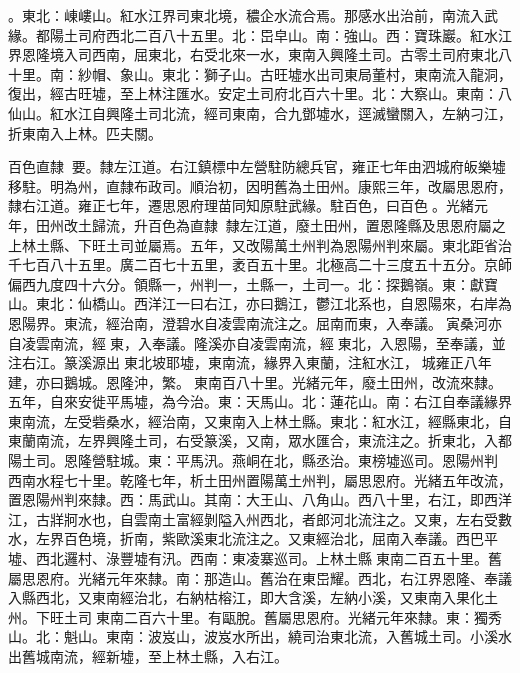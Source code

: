 \begin{pinyinscope}
。東北：崠嶁山。紅水江界司東北境，穠企水流合焉。那感水出治前，南流入武緣。都陽土司府西北二百八十五里。北：岊皁山。南：強山。西：寶珠巖。紅水江界恩隆境入司西南，屈東北，右受北來一水，東南入興隆土司。古零土司府東北八十里。南：紗帽、象山。東北：獅子山。古旺墟水出司東局董村，東南流入龍洞，復出，經古旺墟，至上林注匯水。安定土司府北百六十里。北：大察山。東南：八仙山。紅水江自興隆土司北流，經司東南，合九鄧墟水，逕滅蠻關入，左納刁江，折東南入上林。匹夫關。

百色直隸：要。隸左江道。右江鎮標中左營駐防總兵官，雍正七年由泗城府皈樂墟移駐。明為州，直隸布政司。順治初，因明舊為土田州。康熙三年，改屬思恩府，隸右江道。雍正七年，遷思恩府理苗同知原駐武緣。駐百色，曰百色。光緒元年，田州改土歸流，升百色為直隸，隸左江道，廢土田州，置恩隆縣及思恩府屬之上林土縣、下旺土司並屬焉。五年，又改陽萬土州判為恩陽州判來屬。東北距省治千七百八十五里。廣二百七十五里，袤百五十里。北極高二十三度五十五分。京師偏西九度四十六分。領縣一，州判一，土縣一，土司一。北：探鵝嶺。東：獻寶山。東北：仙橋山。西洋江一曰右江，亦曰鵝江，鬱江北系也，自恩陽來，右岸為恩陽界。東流，經治南，澄碧水自凌雲南流注之。屈南而東，入奉議。寅桑河亦自凌雲南流，經東，入奉議。隆溪亦自凌雲南流，經東北，入恩陽，至奉議，並注右江。篆溪源出東北坡耶墟，東南流，緣界入東蘭，注紅水江，城雍正八年建，亦曰鵝城。恩隆沖，繁。東南百八十里。光緒元年，廢土田州，改流來隸。五年，自來安徙平馬墟，為今治。東：天馬山。北：蓮花山。南：右江自奉議緣界東南流，左受砦桑水，經治南，又東南入上林土縣。東北：紅水江，經縣東北，自東蘭南流，左界興隆土司，右受篆溪，又南，眾水匯合，東流注之。折東北，入都陽土司。恩隆營駐城。東：平馬汛。燕峒在北，縣丞治。東榜墟巡司。恩陽州判西南水程七十里。乾隆七年，析土田州置陽萬土州判，屬思恩府。光緒五年改流，置恩陽州判來隸。西：馬武山。其南：大王山、八角山。西八十里，右江，即西洋江，古牂牁水也，自雲南土富經剝隘入州西北，者郎河北流注之。又東，左右受數水，左界百色境，折南，紫歐溪東北流注之。又東經治北，屈南入奉議。西巴平墟、西北邏村、淥豐墟有汛。西南：東凌寨巡司。上林土縣東南二百五十里。舊屬思恩府。光緒元年來隸。南：那造山。舊治在東岊耀。西北，右江界恩隆、奉議入縣西北，又東南經治北，右納枯榕江，即大含溪，左納小溪，又東南入果化土州。下旺土司東南二百六十里。有甌脫。舊屬思恩府。光緒元年來隸。東：獨秀山。北：魁山。東南：波岌山，波岌水所出，繞司治東北流，入舊城土司。小溪水出舊城南流，經新墟，至上林土縣，入右江。


\end{pinyinscope}

